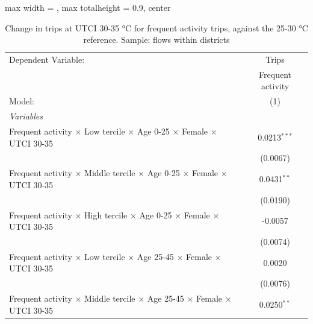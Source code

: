 
\begin{table}[htbp]
   \caption{\label{table_intersectionality_frequent_activity_30-35} Change in trips at UTCI 30-35 °C for frequent activity trips, against the 25-30 °C reference. Sample: flows within districts}
   \centering
   \small
   \begin{adjustbox}{max width = \textwidth, max totalheight = 0.9\textheight, center}
      \begin{tabular}{lc}
         \tabularnewline \midrule \midrule
         Dependent Variable:                                                                                   & Trips\\  
                                                                                                               & Frequent activity \\   
         Model:                                                                                                & (1)\\  
         \midrule
         \emph{Variables}\\
         Frequent activity $\times$ Low tercile $\times$ Age 0-25 $\times$ Female $\times$ UTCI 30-35          & 0.0213$^{***}$\\   
                                                                                                               & (0.0067)\\   
         Frequent activity $\times$ Middle tercile $\times$ Age 0-25 $\times$ Female $\times$ UTCI 30-35       & 0.0431$^{**}$\\   
                                                                                                               & (0.0190)\\   
         Frequent activity $\times$ High tercile $\times$ Age 0-25 $\times$ Female $\times$ UTCI 30-35         & -0.0057\\   
                                                                                                               & (0.0074)\\   
         Frequent activity $\times$ Low tercile $\times$ Age 25-45 $\times$ Female $\times$ UTCI 30-35         & 0.0020\\   
                                                                                                               & (0.0076)\\   
         Frequent activity $\times$ Middle tercile $\times$ Age 25-45 $\times$ Female $\times$ UTCI 30-35      & 0.0250$^{**}$\\   

\end{tabular}
\end{adjustbox}
\end{table}
